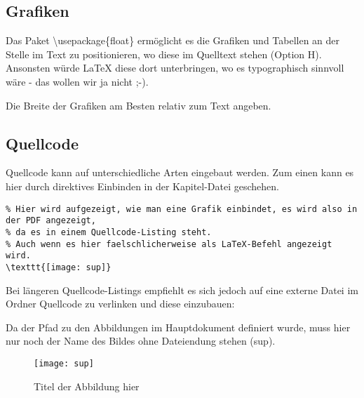 \subsection{Grafiken}
Das Paket \textbackslash usepackage\{float\} ermöglicht es die Grafiken und Tabellen an der Stelle im Text zu positionieren, wo diese im Quelltext stehen (Option H). Ansonsten würde \LaTeX{} diese dort unterbringen, wo es typographisch sinnvoll wäre - das wollen wir ja nicht ;-).

Die Breite der Grafiken am Besten relativ zum Text angeben.

\subsection{Quellcode}
Quellcode kann auf unterschiedliche Arten eingebaut werden.
Zum einen kann es hier durch direktives Einbinden in der Kapitel-Datei geschehen.
\begin{lstlisting}
% Hier wird aufgezeigt, wie man eine Grafik einbindet, es wird also in der PDF angezeigt,
% da es in einem Quellcode-Listing steht.
% Auch wenn es hier faelschlicherweise als LaTeX-Befehl angezeigt wird.
\texttt{[image: sup]}
\end{lstlisting}

Bei längeren Quellcode-Listings empfiehlt es sich jedoch auf eine externe Datei im Ordner Quellcode zu verlinken und diese einzubauen:


Da der Pfad zu den Abbildungen im Hauptdokument definiert wurde, muss hier nur noch der Name des Bildes ohne Dateiendung stehen (sup).


\begin{figure}[H]
\begin{center}
\texttt{[image: sup]}
\caption{Titel der Abbildung hier}
\end{center}
\end{figure}

